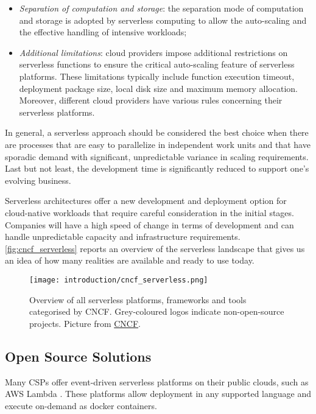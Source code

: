 \documentclass[../thesis.tex]{subfiles}
\begin{document}
\begin{itemize}
    \item \textit{Separation of computation and storage}: the separation mode of computation and storage is adopted by serverless computing to allow the auto-scaling and the effective handling of intensive workloads;
    \item \textit{Additional limitations}: cloud providers impose additional restrictions on serverless functions to ensure the critical auto-scaling feature of serverless platforms. These limitations typically include function execution timeout, deployment package size, local disk size and maximum memory allocation. Moreover, different cloud providers have various rules concerning their serverless platforms.
\end{itemize}

In general, a serverless approach should be considered the best choice when there are processes that are easy to parallelize in independent work units and that have sporadic demand with significant, unpredictable variance in scaling requirements. Last but not least, the development time is significantly reduced to support one's evolving business.

Serverless architectures offer a new development and deployment option for cloud-native workloads that require careful consideration in the initial stages. Companies will have a high speed of change in terms of development and can handle unpredictable capacity and infrastructure requirements.  \autoref{fig:cncf_serverless} reports an overview of the serverless landscape that gives us an idea of how many realities are available and ready to use today.

\begin{figure}[H]
    \centering
    \texttt{[image: introduction/cncf\_serverless.png]}
    \caption[\acrshort{CNCF} serverless landscape]{Overview of all serverless platforms, frameworks and tools categorised by \acrfull{CNCF}. Grey-coloured logos indicate non-open-source projects. Picture from \href{https://landscape.cncf.io/serverless}{CNCF}.}
    \label{fig:cncf_serverless}
\end{figure}

\subsection{Open Source Solutions}
Many \acrshort{CSP}s offer event-driven serverless platforms on their public clouds, such as \acrshort{AWS} Lambda \cite{site:aws_lambda}. These platforms allow deployment in any supported language and execute on-demand as \gls{docker} \cite{article:docker_2014} \gls{container}s.
\end{document}
